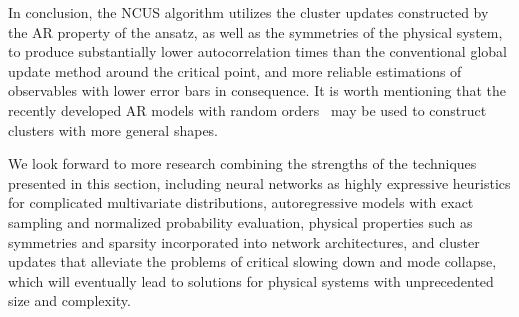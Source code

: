 In conclusion, the NCUS algorithm utilizes the cluster updates constructed by the AR property of the ansatz, as well as the symmetries of the physical system, to produce substantially lower autocorrelation times than the conventional global update method around the critical point, and more reliable estimations of observables with lower error bars in consequence. It is worth mentioning that the recently developed AR models with random orders~\cite{hoogeboom2022autoregressive, pannatier2024sigma, yu2024randomized} may be used to construct clusters with more general shapes.

We look forward to more research combining the strengths of the techniques presented in this section, including neural networks as highly expressive heuristics for complicated multivariate distributions, autoregressive models with exact sampling and normalized probability evaluation, physical properties such as symmetries and sparsity incorporated into network architectures, and cluster updates that alleviate the problems of critical slowing down and mode collapse, which will eventually lead to solutions for physical systems with unprecedented size and complexity.
